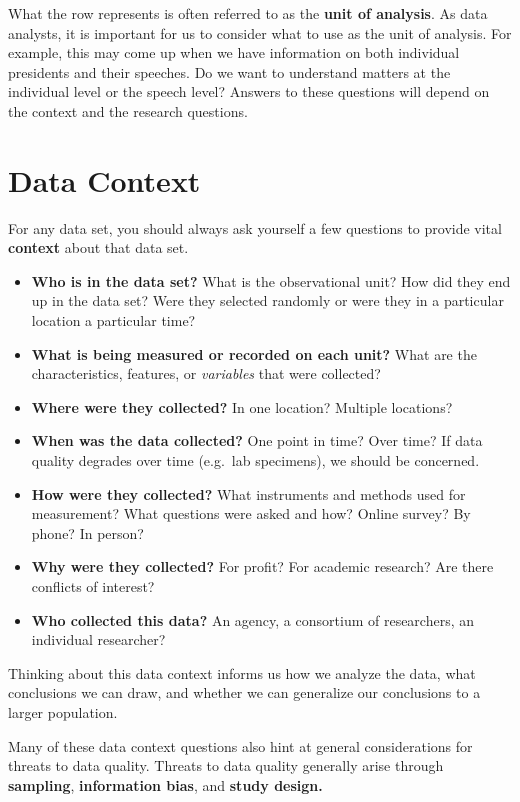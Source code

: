 \documentclass[]{book}
\providecommand{\tightlist}{%
  \setlength{\itemsep}{0pt}\setlength{\parskip}{0pt}}
\begin{document}
What the row represents is often referred to as the \textbf{unit of analysis}. As data analysts, it is important for us to consider what to use as the unit of analysis. For example, this may come up when we have information on both individual presidents and their speeches. Do we want to understand matters at the individual level or the speech level? Answers to these questions will depend on the context and the research questions.

\hypertarget{data-context}{%
\section{Data Context}\label{data-context}}

For any data set, you should always ask yourself a few questions to provide vital \textbf{context} about that data set.

\begin{itemize}
\tightlist
\item
  \textbf{Who is in the data set?} What is the observational unit? How did they end up in the data set? Were they selected randomly or were they in a particular location a particular time?
\item
  \textbf{What is being measured or recorded on each unit?} What are the characteristics, features, or \emph{variables} that were collected?
\item
  \textbf{Where were they collected?} In one location? Multiple locations?
\item
  \textbf{When was the data collected?} One point in time? Over time? If data quality degrades over time (e.g.~lab specimens), we should be concerned.
\item
  \textbf{How were they collected?} What instruments and methods used for measurement? What questions were asked and how? Online survey? By phone? In person?
\item
  \textbf{Why were they collected?} For profit? For academic research? Are there conflicts of interest?
\item
  \textbf{Who collected this data?} An agency, a consortium of researchers, an individual researcher?
\end{itemize}

Thinking about this data context informs us how we analyze the data, what conclusions we can draw, and whether we can generalize our conclusions to a larger population.

Many of these data context questions also hint at general considerations for threats to data quality. Threats to data quality generally arise through \textbf{sampling}, \textbf{information bias}, and \textbf{study design.}
\end{document}
